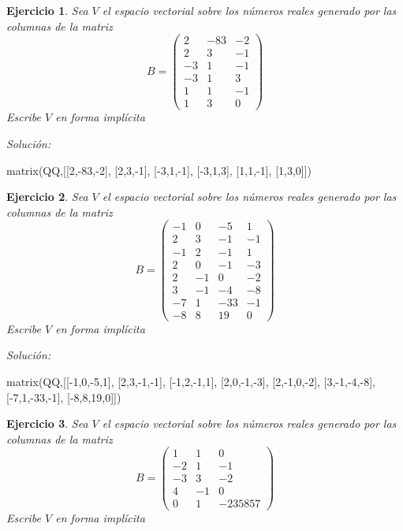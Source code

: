 \documentclass{amsart}
\newtheorem{ejer}{Ejercicio}
\begin{document}
\begin{ejer} Sea $V$ el espacio vectorial sobre los números reales 
generado por las columnas de la matriz 
\[B = \left(\begin{array}{rrr}
2 & -83 & -2 \\
2 & 3 & -1 \\
-3 & 1 & -1 \\
-3 & 1 & 3 \\
1 & 1 & -1 \\
1 & 3 & 0
\end{array}\right)\]
Escribe $V$ en forma impl\'icita 
\end{ejer}

{\it Soluci\'on:}

\begin{sageblock}
matrix(QQ,[[2,-83,-2],
[2,3,-1],
[-3,1,-1],
[-3,1,3],
[1,1,-1],
[1,3,0]])
\end{sageblock}


\begin{ejer} Sea $V$ el espacio vectorial sobre los números reales 
generado por las columnas de la matriz 
\[B = \left(\begin{array}{rrrr}
-1 & 0 & -5 & 1 \\
2 & 3 & -1 & -1 \\
-1 & 2 & -1 & 1 \\
2 & 0 & -1 & -3 \\
2 & -1 & 0 & -2 \\
3 & -1 & -4 & -8 \\
-7 & 1 & -33 & -1 \\
-8 & 8 & 19 & 0
\end{array}\right)\]
Escribe $V$ en forma impl\'icita 
\end{ejer}

{\it Soluci\'on:}

\begin{sageblock}
matrix(QQ,[[-1,0,-5,1],
[2,3,-1,-1],
[-1,2,-1,1],
[2,0,-1,-3],
[2,-1,0,-2],
[3,-1,-4,-8],
[-7,1,-33,-1],
[-8,8,19,0]])
\end{sageblock}



\begin{ejer} Sea $V$ el espacio vectorial sobre los números reales 
generado por las columnas de la matriz 
\[B = \left(\begin{array}{rrr}
1 & 1 & 0 \\
-2 & 1 & -1 \\
-3 & 3 & -2 \\
4 & -1 & 0 \\
0 & 1 & -235857
\end{array}\right)\]
Escribe $V$ en forma impl\'icita 
\end{ejer}
\end{document}
